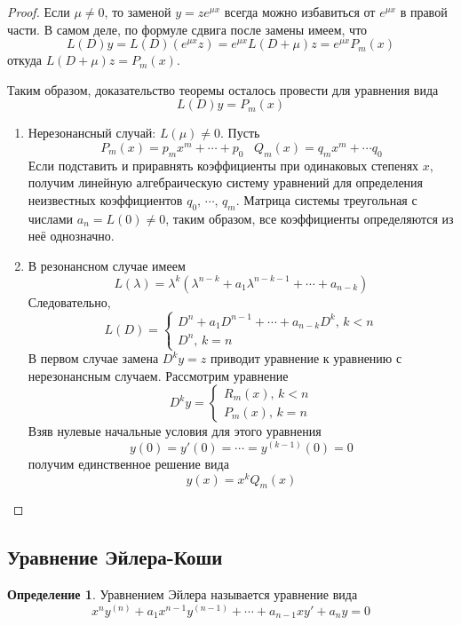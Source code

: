 \documentclass[a4paper,12pt]{article}
\theoremstyle{plain}
\theoremstyle{definition}
\newtheorem{definition}{Определение}[section]
\theoremstyle{remark}
\begin{document}
\begin{proof}
	Если $\mu \neq 0$, то заменой $y = ze^{\mu x}$ всегда можно избавиться от $e^{\mu x}$ в правой части. В самом деле, по формуле сдвига после замены имеем, что
	\[L(D)y = L(D)(e^{\mu x}z) = e^{\mu x}L(D + \mu)z = e^{\mu x}P_m(x)\]
	откуда $L(D + \mu)z = P_m(x)$.

	Таким образом, доказательство теоремы осталось провести для уравнения вида
	\[L(D)y = P_m(x)\]

	\begin{enumerate}
		\item Нерезонансный случай: $L(\mu) \neq 0$. Пусть
		      \[P_m(x) = p_mx^m + \cdots + p_0\;\;\; Q_m(x) = q_mx^m + \cdots q_0\]
		      Если подставить и приравнять коэффициенты при одинаковых степенях $x$, получим линейную алгебраическую систему уравнений для определения неизвестных коэффициентов $q_0,\,\cdots,\,q_m$. Матрица системы треугольная с числами $a_n = L(0) \neq 0$, таким образом, все коэффициенты определяются из неё однозначно.
		\item В резонансном случае имеем
		      \[
			      L(\lambda) = \lambda^k(\lambda^{n - k} + a_1\lambda^{n - k - 1} + \cdots + a_{n - k})
		      \]
		      Следовательно,
		      \[
			      L(D) = \begin{cases}
				      D^n + a_1D^{n-1} + \cdots + a_{n - k}D^k,\, k < n \\
				      D^n,\, k = n
			      \end{cases}
		      \]
		      В первом случае замена $D^ky = z$ приводит уравнение к уравнению с нерезонансным случаем. Рассмотрим уравнение
		      \[
			      D^ky = \begin{cases}
				      R_m(x),\, k < n \\
				      P_m(x),\, k = n
			      \end{cases}
		      \]
		      Взяв нулевые начальные условия для этого уравнения
		      \[
			      y(0) = y'(0) = \cdots = y^{(k - 1)}(0) = 0
		      \]
		      получим единственное решение вида
		      \[
			      y(x) = x^kQ_m(x)
		      \]
	\end{enumerate}
\end{proof}


\subsection{Уравнение Эйлера-Коши}
\begin{definition}
	Уравнением Эйлера называется уравнение вида
	\[x^ny^{(n)} + a_1x^{n-1}y^{(n-1)} + \cdots + a_{n-1}xy' + a_ny = 0\]
\end{definition}
\end{document}
